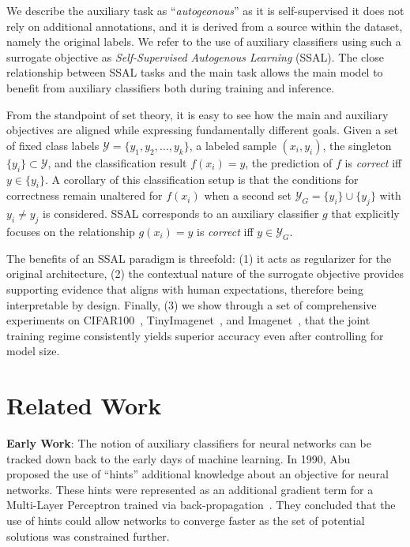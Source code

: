 \documentclass[10pt,twocolumn,letterpaper]{article}
\begin{document}
We describe the auxiliary task as ``\emph{autogeonous}'' as it is self-supervised \ie it does not rely on additional annotations, and it is derived from a source within the dataset, namely the original labels.
We refer to the use of auxiliary classifiers using such a surrogate objective as \emph{Self-Supervised Autogenous Learning} (SSAL).
The close relationship between SSAL tasks and the main task allows the main model to benefit from auxiliary classifiers both during training and inference.

From the standpoint of set theory, it is easy to see how the main and auxiliary objectives are aligned while expressing fundamentally different goals.
Given a set of fixed class labels $\mathcal{Y} = \{y_1, y_2, \dots, y_k\}$, a labeled sample $(x_i, y_i)$, the singleton $\{y_i\} \subset \mathcal{Y}$, and the classification result $f(x_i) = y$, the prediction of $f$ is \emph{correct} iff $y \in \{y_i\}$.
A corollary of this classification setup is that the conditions for correctness remain unaltered for $f(x_i)$ when a second set $\mathcal{Y}_G = \{y_i\} \cup \{y_j\}$ with $y_i \neq y_j$ is considered.
SSAL corresponds to an auxiliary classifier $g$ that explicitly focuses on the relationship $g(x_i) = y$ is \emph{correct} iff $y \in \mathcal{Y}_G$.

The benefits of an SSAL paradigm is threefold: (1) it acts as regularizer for the original architecture, (2) the contextual nature of the surrogate objective provides supporting evidence that aligns with human expectations, therefore being interpretable by design.
Finally, (3) we show through a set of comprehensive experiments on CIFAR100~\cite{krizhevsky2009learning}, TinyImagenet~\cite{tinyimagenet}, and Imagenet~\cite{russakovsky2015imagenet}, that the joint training regime consistently yields superior accuracy even after controlling for model size.


\section{Related Work}
\label{sec:relatedwork}

\textbf{Early Work}: The notion of auxiliary classifiers for neural networks can be tracked down back to the early days of machine learning.  In 1990, Abu \etal~\cite{abu1990learning} proposed the use of ``hints'' \ie additional knowledge about an objective for neural networks.
These hints were represented as an additional gradient term for a Multi-Layer Perceptron trained via back-propagation~\cite{rumelhart1983learning}.
They concluded that the use of hints could allow networks to converge faster as the set of potential solutions was constrained further.
\end{document}
